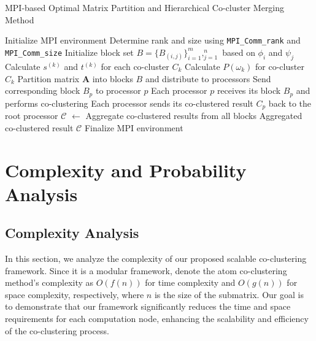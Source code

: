 \documentclass[journal]{IEEEtran}
\begin{document}
\begin{algorithm}[!t]
  \caption{MPI-based Optimal Matrix Partition and Hierarchical Co-cluster Merging Method}\label{alg:mpi_method}
  \begin{algorithmic}[1]
    \STATE Initialize MPI environment
    \STATE Determine rank and size using \texttt{MPI\_Comm\_rank} and \texttt{MPI\_Comm\_size}
    \STATE Initialize block set $B = \{B_{(i,j)}\}_{i=1}^m,_{j=1}^n$ based on $\phi_i$ and $\psi_j$
    \STATE Calculate $s^{(k)}$ and $t^{(k)}$ for each co-cluster $C_k$
    \STATE Calculate $P(\omega_k)$ for co-cluster $C_k$
    \STATE Partition matrix $\mathbf{A}$ into blocks $B$ and distribute to processors
    \STATE Send corresponding block $B_p$ to processor $p$
    \ENDFOR
    \ENDIF
    \ENDFOR
    \ENDIF
    \STATE Each processor $p$ receives its block $B_p$ and performs co-clustering
    \STATE Each processor sends its co-clustered result $C_p$ back to the root processor
    \STATE $\mathcal{C}$ $\gets$ Aggregate co-clustered results from all blocks
    \RETURN Aggregated co-clustered result $\mathcal{C}$
    \ENDIF
    \STATE Finalize MPI environment
  \end{algorithmic}
\end{algorithm}

\section{Complexity and Probability Analysis}

\label{sec:analysis}

\subsection{Complexity Analysis}
\label{subsubsec:complexity}
In this section, we analyze the complexity of our proposed scalable co-clustering framework. Since it is a modular framework, denote the atom co-clustering method's complexity as \(O(f(n))\) for time complexity and \(O(g(n))\) for space complexity, respectively, where \(n\) is the size of the submatrix. Our goal is to demonstrate that our framework significantly reduces the time and space requirements for each computation node, enhancing the scalability and efficiency of the co-clustering process.
\end{document}
